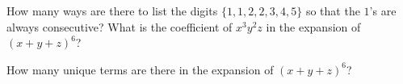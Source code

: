 \documentclass[12pt,twoside]{article}
\begin{document}
\begin{problem}{45}
How many ways are there to list the digits $\{ 1, 1, 2, 2, 3, 4, 5 \}$ so that the $1$'s are always consecutive?
 What is the coefficient of $x^3y^2z$ in the expansion of $(x + y + z)^6$?

 How many unique terms are there in the expansion of $(x + y + z)^6$?

\eparts
\end{problem}
\end{document}
